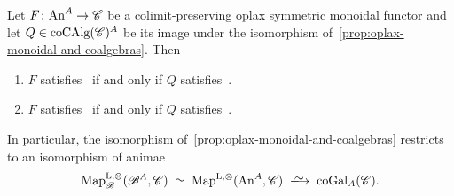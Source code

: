 \documentclass[english,svgnames,table]{article}
\begin{document}
    \begin{theorem}
    \label{prop:coGal-FunL-iso}
        Let $F \colon \mathrm{An}^A \to \mathscr{C}$ be a colimit-preserving oplax symmetric monoidal functor and let $Q \in \operatorname{coCAlg}(\mathscr{C})^A$ be its image under the isomorphism of~\cref{prop:oplax-monoidal-and-coalgebras}. Then
        \begin{enumerate}
            \item $F$ satisfies~ if and only if $Q$ satisfies~.
            \item $F$ satisfies~ if and only if $Q$ satisfies~.
        \end{enumerate}
        In particular, the isomorphism of~\cref{prop:oplax-monoidal-and-coalgebras} restricts to an isomorphism of animae
        \begin{equation*}
            \MapBo(\basecat^A, \cC) \;\simeq\; \MapCo[](\An^A, \cC) \;\isotoo\; \coGal_A(\cC).
        \end{equation*}
    \end{theorem}
\end{document}
